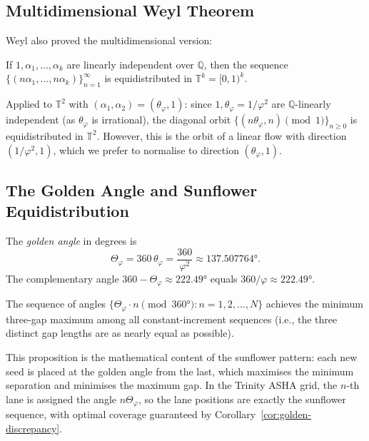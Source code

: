 \subsection{Multidimensional Weyl Theorem}\label{subsec:ch18-weyl-multi}

Weyl also proved the multidimensional version:

\begin{theorem}\label{thm:weyl-multi}
If $1, \alpha_1, \ldots, \alpha_k$ are linearly independent over $\mathbb{Q}$, then the
sequence $\{(n\alpha_1, \ldots, n\alpha_k)\}_{n=1}^\infty$ is equidistributed in
$\mathbb{T}^k = [0,1)^k$.
\end{theorem}

Applied to $\mathbb{T}^2$ with $(\alpha_1, \alpha_2) = (\theta_\varphi, 1)$:
since $1, \theta_\varphi = 1/\varphi^2$ are $\mathbb{Q}$-linearly independent
(as $\theta_\varphi$ is irrational), the diagonal orbit
$\{(n\theta_\varphi, n) \pmod{1}\}_{n\ge 0}$ is equidistributed in $\mathbb{T}^2$.
However, this is the orbit of a linear flow with direction $(1/\varphi^2, 1)$,
which we prefer to normalise to direction $(\theta_\varphi, 1)$.

\subsection{The Golden Angle and Sunflower Equidistribution}\label{subsec:ch18-sunflower}

The \emph{golden angle} in degrees is
\begin{equation}\label{eq:golden-angle-deg}
  \Theta_\varphi = 360\,\theta_\varphi = \frac{360}{\varphi^2} \approx 137.507764°.
\end{equation}
The complementary angle $360 - \Theta_\varphi \approx 222.49°$ equals $360/\varphi \approx 222.49°$.

\begin{proposition}\label{prop:sunflower}
The sequence of angles $\{\Theta_\varphi \cdot n \pmod{360°} : n = 1,2,\ldots,N\}$
achieves the minimum three-gap maximum among all constant-increment sequences
(i.e., the three distinct gap lengths are as nearly equal as possible).
\end{proposition}

This proposition is the mathematical content of the sunflower pattern: each new seed
is placed at the golden angle from the last, which maximises the minimum separation
and minimises the maximum gap.
In the Trinity ASHA grid, the $n$-th lane is assigned the angle $n\Theta_\varphi$,
so the lane positions are exactly the sunflower sequence, with optimal coverage
guaranteed by Corollary~\ref{cor:golden-discrepancy}.

